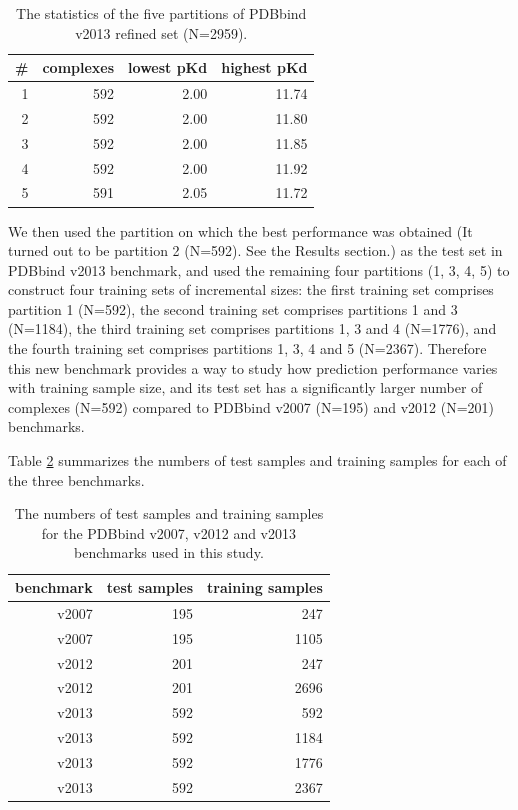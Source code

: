 \documentclass[journal=jacsat,manuscript=article]{achemso}
\begin{document}
\begin{table}
\caption{The statistics of the five partitions of PDBbind v2013 refined set (N=2959).}
\label{tbl:partitions}
\begin{tabular}{rrrr}
\hline
\# & complexes & lowest pKd & highest pKd\\
\hline
1 & 592 & 2.00 & 11.74\\
2 & 592 & 2.00 & 11.80\\
3 & 592 & 2.00 & 11.85\\
4 & 592 & 2.00 & 11.92\\
5 & 591 & 2.05 & 11.72\\
\hline
\end{tabular}
\end{table}

We then used the partition on which the best performance was obtained (It turned out to be partition 2 (N=592). See the Results section.) as the test set in PDBbind v2013 benchmark, and used the remaining four partitions (1, 3, 4, 5) to construct four training sets of incremental sizes: the first training set comprises partition 1 (N=592), the second training set comprises partitions 1 and 3 (N=1184), the third training set comprises partitions 1, 3 and 4 (N=1776), and the fourth training set comprises partitions 1, 3, 4 and 5 (N=2367). Therefore this new benchmark provides a way to study how prediction performance varies with training sample size, and its test set has a significantly larger number of complexes (N=592) compared to PDBbind v2007 (N=195) and v2012 (N=201) benchmarks.

Table \ref{tbl:benchmarks} summarizes the numbers of test samples and training samples for each of the three benchmarks.

\begin{table}
\caption{The numbers of test samples and training samples for the PDBbind v2007, v2012 and v2013 benchmarks used in this study.}
\label{tbl:benchmarks}
\begin{tabular}{rrr}
\hline
benchmark & test samples & training samples\\
\hline
v2007 & 195 &  247\\
v2007 & 195 & 1105\\
v2012 & 201 &  247\\
v2012 & 201 & 2696\\
v2013 & 592 &  592\\
v2013 & 592 & 1184\\
v2013 & 592 & 1776\\
v2013 & 592 & 2367\\
\hline
\end{tabular}
\end{table}
\end{document}
